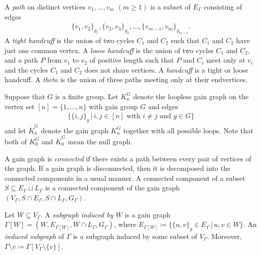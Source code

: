 \documentclass[pdftex]{sigma}
\numberwithin{equation}{section}
\begin{document}
A \textit{path} on distinct vertices $ v_{1}, \dots, v_{m}$ $(m \geq 1) $ is a subset of $ E_{\Gamma} $ consisting of edges
\begin{gather*}
\{v_{1}, v_{2} \}_{g_{1}}, \{v_{2}, v_{3} \}_{g_{2}}, \dots, \{v_{m-1}, v_{m} \}_{g_{m-1}}.
\end{gather*}
A \textit{tight handcuff} is the union of two cycles $ C_{1} $ and $ C_{2} $ such that $ C_{1} $ and $ C_{2} $ have just one common vertex.
A \textit{loose handcuff} is the union of two cycles $ C_{1} $ and $ C_{2} $, and a path $ P $ from $ v_{1} $ to $ v_{2} $ of positive length such that $ P $ and $ C_{i} $ meet only at $ v_{i} $ and the cycles $ C_{1} $ and $ C_{2} $ does not share vertices.
A \textit{handcuff} is a tight or loose handcuff.
A \textit{theta} is the union of three paths meeting only at their endvertices.

Suppose that $ G $ is a finite group.
Let $ K_{n}^{G} $ denote the loopless gain graph on the vertex set $ [n] = \{1, \dots, n\} $ with gain group $ G $ and edges
\begin{align*}
\{ \{i,j\}_{g} \,|\, i,j \in [n] \text{ with } i \neq j \text{ and } g \in G\}
\end{align*}
and let $ \mathring{K}_{n}^{G} $ denote the gain graph $ K_{n}^{G} $ together with all possible loops.
Note that both of $ K_{0}^{G} $ and $ \mathring{K}_{0}^{G} $ mean the null graph.

A gain graph is \textit{connected} if there exists a path between every pair of vertices of the graph.
If a gain graph is disconnected, then it is decomposed into the connected components in a usual manner.
A connected component of a subset $ S \subseteq E_{\Gamma} \sqcup L_{\Gamma} $ is a connected component of the gain graph $ (V_{\Gamma}, S\cap E_{\Gamma}, S\cap L_{\Gamma}, G_{\Gamma}) $.

Let $ W \subseteq V_{\Gamma} $.
A \textit{subgraph induced by $ W $} is a gain graph $ \Gamma[W] = (W, E_{\Gamma[W]}, W \cap L_{\Gamma}, G_{\Gamma}) $, where $ E_{\Gamma[W]} \coloneqq \{ \{u,v\}_{g} \in E_{\Gamma} \,|\, u,v \in W \} $.
An \textit{induced subgraph} of $ \Gamma $ is a subgraph induced by some subset of $ V_{\Gamma} $.
Moreover, $ \Gamma \setminus v \coloneqq \Gamma[V_{\Gamma}\setminus\{v\}] $.
\end{document}
